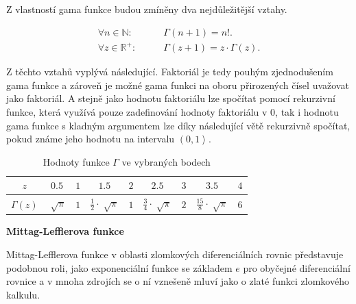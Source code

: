 \documentclass[a4paper,12pt,twoside]{article}
\newtheorem{veta}{Věta}[section]
\theoremstyle{definition}
\theoremstyle{remark}
\numberwithin{equation}{section}
\numberwithin{table}{section}
\numberwithin{figure}{section}
\newcommand{\R}{\mathbb{R}}
\newcommand{\N}{\mathbb{N}}
\begin{document}
Z vlastností gama funkce budou zmíněny dva nejdůležitější vztahy.

\begin{align} 	
	\forall n \in \N:	\qquad  &\Gamma\left( n+1\right)  = n!.\label{gamma}\\
	\forall z \in \R^{+}:\qquad &\Gamma\left( z+1\right)  = z \cdot \Gamma\left(z\right).\label{gamma2}
\end{align}

Z těchto vztahů vyplývá následující. Faktoriál je tedy pouhým zjednodušením gama funkce a zároveň je možné gama funkci na oboru přirozených čísel uvažovat jako faktoriál. A stejně jako hodnotu faktoriálu lze spočítat pomocí rekurzivní funkce, která využívá pouze zadefinování hodnoty faktoriálu v 0, tak i hodnotu gama funkce s kladným argumentem lze díky následující větě rekurzivně spočítat, pokud známe jeho hodnotu na intervalu $\left( 0, 1\right\rangle $.


\begin{table}[h!]
	\centering
	\caption{Hodnoty funkce $\Gamma$ ve vybraných bodech}\label{tab1}
	\begin{tabular}{|c|cccccccc|}
		\toprule
		$z$ 					& $0.5$				&	$1$ &	$1.5$ 							&	$2$ & $2.5$ 							& $3$ & $3.5$ 							&	$4$ 		\\\midrule
		$\Gamma \left(z\right)$ & $\sqrt[]{\pi}$ 	& 	$1$ &	${\frac{1}{2}}\cdot\sqrt[]{\pi}$&	$1$ & ${\frac{3}{4}}\cdot\sqrt[]{\pi}$ 	& $2$ &	${\frac{15}{8}}\cdot\sqrt[]{\pi}$ & $6$ \\
		\bottomrule
	\end{tabular}
\end{table}

\noindent \textbf{Mittag-Lefflerova funkce}

\medskip
\noindent Mittag-Lefflerova funkce v oblasti zlomkových diferenciálních rovnic představuje podobnou roli, jako exponenciální funkce se základem $e$ pro obyčejné diferenciální rovnice a v mnoha zdrojích se o ní vznešeně mluví jako o zlaté funkci zlomkového kalkulu.
\end{document}
